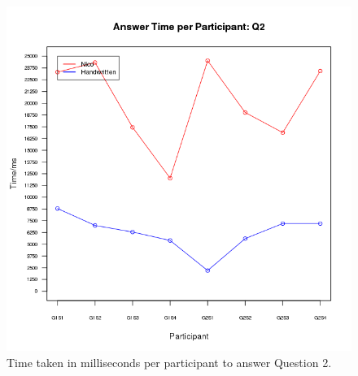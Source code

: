 \documentclass[12pt,twoside,notitlepage,xetex]{report}
\begin{document}
{\begin{center}
\begin{figure}[H]
\begin{center}
\includegraphics[height=\textheight/2-2cm]{figs/graphs/q2.png}
\end{center}
\caption{Time taken in milliseconds per participant to answer Question 2.}
\end{figure}
\end{center}

}
\end{document}

